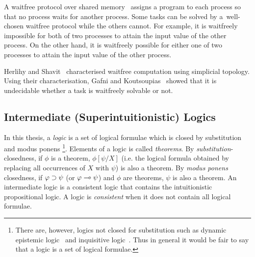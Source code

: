 A waitfree protocol over shared memory~\cite{herlihy1991wait}
 assigns a program to each process so that no process waits for another process.
Some tasks can be solved by a~well-chosen waitfree protocol while the others cannot.
For example,
 it is waitfreely impossible for both of two processes to attain the input value of the other
 process.
 On the other hand, it is waitfreely possible for
 either one of two processes to attain the input value of the other process.

Herlihy and Shavit~\cite{herlihy1999topological} characterised waitfree computation using
simplicial topology.
Using their characterisation,
Gafni and Koutsoupias~\cite{gafni1999three}
 showed that it is undecidable whether a task is waitfreely solvable
 or not.

\subsection{Intermediate (Superintuitionistic) Logics}

In this thesis,
a \textit{logic} is a set of logical formulae which is
closed by
substitution and modus ponens%
\footnote{There are, however, logics not closed for substitution such as
dynamic epistemic logic~\citep{ditmarsch2007dynamic} and
inquisitive logic~\citep{ciardelli2011}.  Thus
in general it would be fair to say that a logic is a set of logical
formulae.}.
Elements of a logic is called \textit{theorems}.
By \textit{substitution}-closedness, if $\phi$ is a
theorem, $\phi[\psi/X]$ (i.e. the
logical formula obtained by replacing all occurrences of $X$ with
$\psi$) is also a theorem.
By \textit{modus ponens} closedness, if
$\varphi\supset\psi$ (or $\varphi\multimap\psi$) and $\phi$ are
theorems, $\psi$ is also a theorem.
An intermediate logic is a consistent logic
that contains the intuitionistic propositional logic.  A logic is
\textit{consistent} when it does not
contain all logical formulae.

